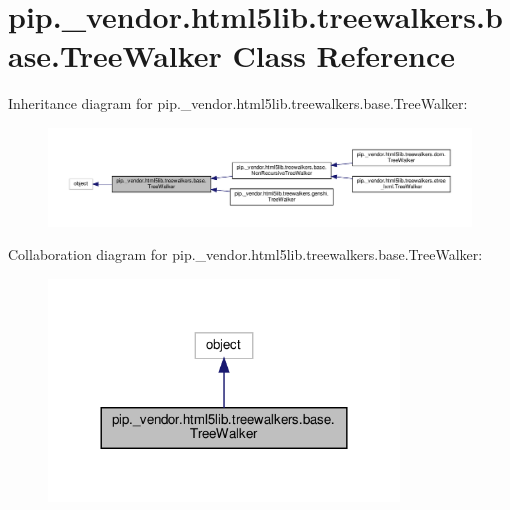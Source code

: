 \hypertarget{classpip_1_1__vendor_1_1html5lib_1_1treewalkers_1_1base_1_1TreeWalker}{}\section{pip.\+\_\+vendor.\+html5lib.\+treewalkers.\+base.\+Tree\+Walker Class Reference}
\label{classpip_1_1__vendor_1_1html5lib_1_1treewalkers_1_1base_1_1TreeWalker}


Inheritance diagram for pip.\+\_\+vendor.\+html5lib.\+treewalkers.\+base.\+Tree\+Walker\+:
\nopagebreak
\begin{figure}[H]
\begin{center}
\leavevmode
\includegraphics[width=350pt]{classpip_1_1__vendor_1_1html5lib_1_1treewalkers_1_1base_1_1TreeWalker__inherit__graph}
\end{center}
\end{figure}


Collaboration diagram for pip.\+\_\+vendor.\+html5lib.\+treewalkers.\+base.\+Tree\+Walker\+:
\nopagebreak
\begin{figure}[H]
\begin{center}
\leavevmode
\includegraphics[width=264pt]{classpip_1_1__vendor_1_1html5lib_1_1treewalkers_1_1base_1_1TreeWalker__coll__graph}
\end{center}
\end{figure}

